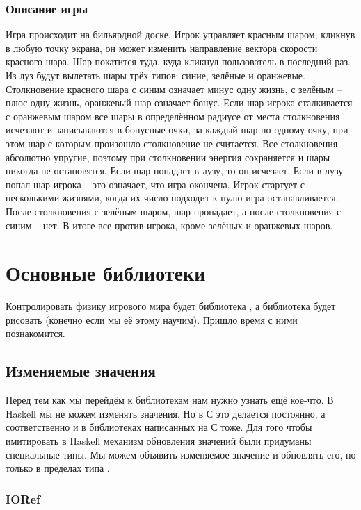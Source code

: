 \subsubsection{Описание игры}

Игра происходит на бильярдной доске. Игрок управляет красным шаром,
кликнув в любую точку экрана, он может изменить направление вектора
скорости красного шара. Шар покатится туда, куда кликнул пользователь в
последний раз. Из луз будут вылетать шары трёх типов: синие, зелёные и
оранжевые. Столкновение красного шара с синим означает минус одну жизнь,
с зелёным -- плюс одну жизнь, оранжевый шар означает бонус. Если шар
игрока сталкивается с оранжевым шаром все шары в определённом радиусе от
места столкновения исчезают и записываются в бонусные очки, за каждый
шар по одному очку, при этом шар с которым произошло столкновение не
считается. Все столкновения -- абсолютно упругие, поэтому при
столкновении энергия сохраняется и шары никогда не остановятся. Если шар
попадает в лузу, то он исчезает. Если в лузу попал шар игрока -- это
означает, что игра окончена. Игрок стартует с несколькими жизнями, когда
их число подходит к нулю игра останавливается. После столкновения с
зелёным шаром, шар пропадает, а после столкновения с синим -- нет. В
итоге все против игрока, кроме зелёных и оранжевых шаров.

\section{Основные библиотеки}

Контролировать физику игрового мира будет библиотека , а
библиотека  будет рисовать (конечно если мы её этому научим).
Пришло время с ними познакомится.

\subsection{Изменяемые значения}

Перед тем как мы перейдём к библиотекам нам нужно узнать ещё кое-что. В
Haskell мы не можем изменять значения. Но в С это делается постоянно, а
соответственно и в библиотеках написанных на С тоже. Для того чтобы
имитировать в Haskell механизм обновления значений были придуманы
специальные типы. Мы можем объявить изменяемое значение и обновлять его,
но только в пределах типа .

\subsubsection{IORef}

